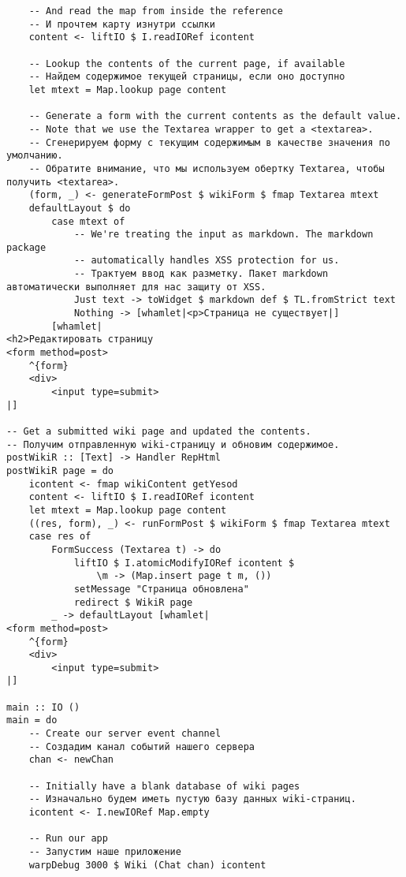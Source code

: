 \begin{lstlisting}
    -- And read the map from inside the reference
    -- И прочтем карту изнутри ссылки
    content <- liftIO $ I.readIORef icontent

    -- Lookup the contents of the current page, if available
    -- Найдем содержимое текущей страницы, если оно доступно
    let mtext = Map.lookup page content

    -- Generate a form with the current contents as the default value.
    -- Note that we use the Textarea wrapper to get a <textarea>.
    -- Сгенерируем форму с текущим содержимым в качестве значения по умолчанию.
    -- Обратите внимание, что мы используем обертку Textarea, чтобы получить <textarea>.
    (form, _) <- generateFormPost $ wikiForm $ fmap Textarea mtext
    defaultLayout $ do
        case mtext of
            -- We're treating the input as markdown. The markdown package
            -- automatically handles XSS protection for us.
            -- Трактуем ввод как разметку. Пакет markdown автоматически выполняет для нас защиту от XSS.
            Just text -> toWidget $ markdown def $ TL.fromStrict text
            Nothing -> [whamlet|<p>Страница не существует|]
        [whamlet|
<h2>Редактировать страницу
<form method=post>
    ^{form}
    <div>
        <input type=submit>
|]

-- Get a submitted wiki page and updated the contents.
-- Получим отправленную wiki-страницу и обновим содержимое.
postWikiR :: [Text] -> Handler RepHtml
postWikiR page = do
    icontent <- fmap wikiContent getYesod
    content <- liftIO $ I.readIORef icontent
    let mtext = Map.lookup page content
    ((res, form), _) <- runFormPost $ wikiForm $ fmap Textarea mtext
    case res of
        FormSuccess (Textarea t) -> do
            liftIO $ I.atomicModifyIORef icontent $
                \m -> (Map.insert page t m, ())
            setMessage "Страница обновлена"
            redirect $ WikiR page
        _ -> defaultLayout [whamlet|
<form method=post>
    ^{form}
    <div>
        <input type=submit>
|]

main :: IO ()
main = do
    -- Create our server event channel
    -- Создадим канал событий нашего сервера
    chan <- newChan

    -- Initially have a blank database of wiki pages
    -- Изначально будем иметь пустую базу данных wiki-страниц.
    icontent <- I.newIORef Map.empty

    -- Run our app
    -- Запустим наше приложение
    warpDebug 3000 $ Wiki (Chat chan) icontent
\end{lstlisting}